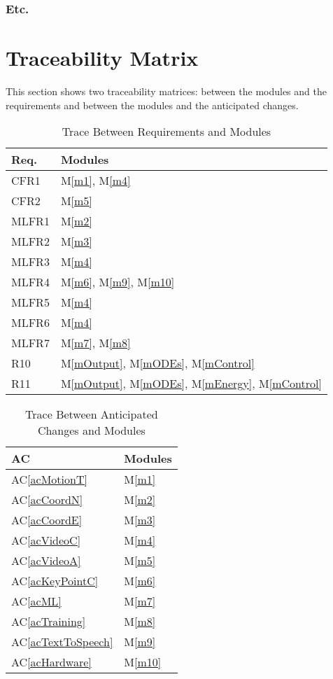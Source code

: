 \documentclass[12pt, titlepage]{article}
\newcommand{\acref}[1]{AC\ref{#1}}
\newcommand{\mref}[1]{M\ref{#1}}
\begin{document}
\subsubsection{Etc.}

\section{Traceability Matrix} \label{SecTM}

This section shows two traceability matrices: between the modules and the
requirements and between the modules and the anticipated changes.

\begin{table}[H]
\centering
\begin{tabular}{p{} p{}}
\toprule
\textbf{Req.} & \textbf{Modules}\\
\midrule
CFR1 & \mref{m1}, \mref{m4}\\
CFR2 & \mref{m5}\\
MLFR1 & \mref{m2}\\
MLFR2 & \mref{m3}\\
MLFR3 & \mref{m4}\\
MLFR4 & \mref{m6}, \mref{m9}, \mref{m10}\\
MLFR5 & \mref{m4}\\
MLFR6 & \mref{m4}\\
MLFR7 & \mref{m7}, \mref{m8}\\
R10 & \mref{mOutput}, \mref{mODEs}, \mref{mControl}\\
R11 & \mref{mOutput}, \mref{mODEs}, \mref{mEnergy}, \mref{mControl}\\
\bottomrule
\end{tabular}
\caption{Trace Between Requirements and Modules}
\label{TblRT}
\end{table}

\begin{table}[H]
\centering
\begin{tabular}{p{} p{}}
\toprule
\textbf{AC} & \textbf{Modules}\\
\midrule
\acref{acMotionT} & \mref{m1}\\
\acref{acCoordN} & \mref{m2}\\
\acref{acCoordE} & \mref{m3}\\
\acref{acVideoC} & \mref{m4}\\
\acref{acVideoA} & \mref{m5}\\
\acref{acKeyPointC} & \mref{m6}\\
\acref{acML} & \mref{m7}\\
\acref{acTraining} & \mref{m8}\\
\acref{acTextToSpeech} & \mref{m9}\\
\acref{acHardware} & \mref{m10}\\





\bottomrule
\end{tabular}
\caption{Trace Between Anticipated Changes and Modules}
\label{TblACT}
\end{table}
\end{document}
